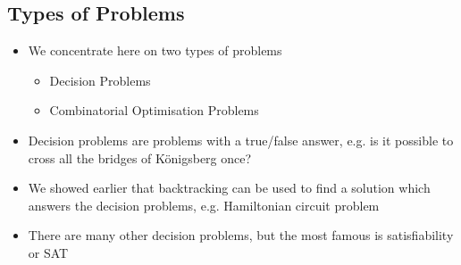 
\begin{slide}
\section{Types of Problems}

\begin{PauseHighLight}
  \begin{itemize}
  \item We concentrate here on two types of problems
    \begin{itemize}
    \item Decision Problems
    \item Combinatorial Optimisation Problems\pause
    \end{itemize}
  \item Decision problems are problems with a true/false answer, e.g. is
    it possible to cross all the bridges of K\"onigsberg once?\pause
  \item We showed earlier that backtracking can be used to find a
    solution which answers the decision problems, e.g. Hamiltonian
    circuit problem\pause
  \item There are many other decision problems, but the most famous is
    satisfiability or SAT\pause
  \end{itemize}
\end{PauseHighLight}

\end{slide}


